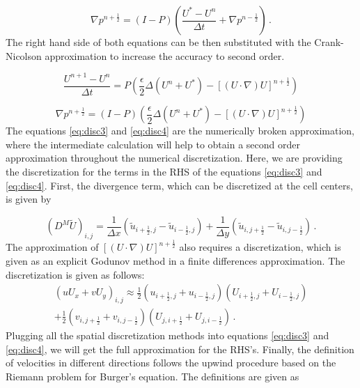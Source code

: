 \documentclass{article}
\begin{document}
\begin{equation}
\label{eq:disc2}
\nabla p^{n+ \frac{1}{2}} = (I-P) \left(\frac{U^* - U^n}{\Delta t} + \nabla p^{n-\frac{1}{2}} \right) \,.
 \end{equation}
The right hand side of both equations can be then substituted with the Crank-Nicolson approximation to increase the accuracy to second order.

\begin{equation}
\label{eq:disc3}
\frac{U^{n+1} - U^n}{\Delta t} = P \left( \frac{\epsilon}{2} \Delta (U^n + U^* ) - [(U \cdot \nabla) U]^{n+\frac{1}{2}} \right)
 \end{equation}

\begin{equation}
\label{eq:disc4}
\nabla p^{n+ \frac{1}{2}} = (I-P) \left(\frac{\epsilon}{2} \Delta (U^n + U^* ) - [(U \cdot \nabla) U]^{n+\frac{1}{2}}\right)
 \end{equation}
 The equations \eqref{eq:disc3} and  \eqref{eq:disc4} are the numerically broken approximation, where the intermediate calculation will help to obtain a second order approximation throughout the numerical discretization. Here, we are providing the discretization for the terms in the RHS of the equations \eqref{eq:disc3} and  \eqref{eq:disc4}. First, the divergence term, which can be discretized at the cell centers, is given by
 
 \begin{equation}
\label{eq:disc5}
\left(D^M  \tilde{U}\right)_{i,j} = \frac{1}{\Delta x} \left(\tilde{u}_{i+\frac{1}{2},j} - \tilde{u}_{i-\frac{1}{2},j}\right) + \frac{1}{\Delta y} \left(\tilde{u}_{i,j+\frac{1}{2}} - \tilde{u}_{i,j-\frac{1}{2}}\right) \,.
 \end{equation}
The approximation of $[(U \cdot \nabla) U]^{n+ \frac{1}{2}}$ also requires a discretization, which is given as an explicit Godunov method in a finite differences approximation. The discretization is given as follows:
\begin{equation}
\label{eq:disc6}
\begin{split}
(u U_x + v U_y)_{i,j} \approx \frac{1}{2} \left(u_{i+\frac{1}{2},j}+u_{i-\frac{1}{2},j}\right)\left(U_{i+\frac{1}{2},j}+U_{i-\frac{1}{2},j}\right) \\
+ \frac{1}{2} \left(v_{i,j+\frac{1}{2}}+v_{i,j-\frac{1}{2}}\right)\left(U_{j,i+\frac{1}{2}}+U_{j,i-\frac{1}{2}}\right) \,.
\end{split}
\end{equation}
Plugging all the spatial discretization methods into equations \eqref{eq:disc3} and \eqref{eq:disc4}, we will get the full approximation for the RHS's.
Finally, the definition of velocities in different directions follows the upwind procedure based on the Riemann problem for Burger's equation. The definitions are given as
\end{document}
